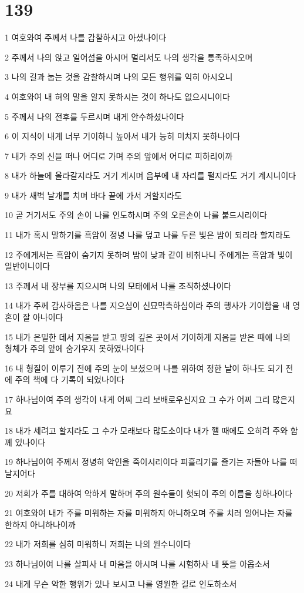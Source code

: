 \chapter{139}

\par 1 여호와여 주께서 나를 감찰하시고 아셨나이다
\par 2 주께서 나의 앉고 일어섬을 아시며 멀리서도 나의 생각을 통족하시오며
\par 3 나의 길과 눕는 것을 감찰하시며 나의 모든 행위를 익히 아시오니
\par 4 여호와여 내 혀의 말을 알지 못하시는 것이 하나도 없으시니이다
\par 5 주께서 나의 전후를 두르시며 내게 안수하셨나이다
\par 6 이 지식이 내게 너무 기이하니 높아서 내가 능히 미치지 못하나이다
\par 7 내가 주의 신을 떠나 어디로 가며 주의 앞에서 어디로 피하리이까
\par 8 내가 하늘에 올라갈지라도 거기 계시며 음부에 내 자리를 펼지라도 거기 계시니이다
\par 9 내가 새벽 날개를 치며 바다 끝에 가서 거할지라도
\par 10 곧 거기서도 주의 손이 나를 인도하시며 주의 오른손이 나를 붙드시리이다
\par 11 내가 혹시 말하기를 흑암이 정녕 나를 덮고 나를 두른 빛은 밤이 되리라 할지라도
\par 12 주에게서는 흑암이 숨기지 못하며 밤이 낮과 같이 비취나니 주에게는 흑암과 빛이 일반이니이다
\par 13 주께서 내 장부를 지으시며 나의 모태에서 나를 조직하셨나이다
\par 14 내가 주께 감사하옴은 나를 지으심이 신묘막측하심이라 주의 행사가 기이함을 내 영혼이 잘 아나이다
\par 15 내가 은밀한 데서 지음을 받고 땅의 깊은 곳에서 기이하게 지음을 받은 때에 나의 형체가 주의 앞에 숨기우지 못하였나이다
\par 16 내 형질이 이루기 전에 주의 눈이 보셨으며 나를 위하여 정한 날이 하나도 되기 전에 주의 책에 다 기록이 되었나이다
\par 17 하나님이여 주의 생각이 내게 어찌 그리 보배로우신지요 그 수가 어찌 그리 많은지요
\par 18 내가 세려고 할지라도 그 수가 모래보다 많도소이다 내가 깰 때에도 오히려 주와 함께 있나이다
\par 19 하나님이여 주께서 정녕히 악인을 죽이시리이다 피흘리기를 즐기는 자들아 나를 떠날지어다
\par 20 저희가 주를 대하여 악하게 말하며 주의 원수들이 헛되이 주의 이름을 칭하나이다
\par 21 여호와여 내가 주를 미워하는 자를 미워하지 아니하오며 주를 치러 일어나는 자를 한하지 아니하나이까
\par 22 내가 저희를 심히 미워하니 저희는 나의 원수니이다
\par 23 하나님이여 나를 살피사 내 마음을 아시며 나를 시험하사 내 뜻을 아옵소서
\par 24 내게 무슨 악한 행위가 있나 보시고 나를 영원한 길로 인도하소서

